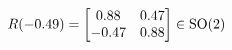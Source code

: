\documentclass[preview]{standalone}
\begin{document}
\begin{align*}
\special{dvisvgm:raw <g id='unique000'>}R(-0.49) = \begin{bmatrix} 0.88 & 0.47 \\ -0.47 & 0.88 \end{bmatrix} \in \text{SO}(2)\special{dvisvgm:raw </g>}
\end{align*}
\end{document}
